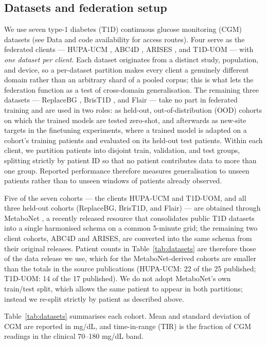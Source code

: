 \documentclass[10pt,letterpaper]{article}
\begin{document}
\subsection*{Datasets and federation setup}

We use seven type-1 diabetes (T1D) continuous glucose
monitoring (CGM) datasets (see Data and code availability for access routes). Four serve as the federated clients --- HUPA-UCM
\cite{hidalgo2024hupaucm}, ABC4D \cite{abc4d_nct}, ARISES \cite{zhu2022arises},
and T1D-UOM \cite{alsuhaymi2025t1duom} --- with \emph{one dataset per client}. Each dataset
originates from a distinct study, population, and device, so a per-dataset
partition makes every client a genuinely different domain rather than an
arbitrary shard of a pooled corpus; this is what lets the federation function as
a test of cross-domain generalisation. The remaining three datasets ---
ReplaceBG \cite{aleppo2017replacebg}, BrisT1D \cite{james2025brist1d}, and Flair
\cite{jaeb_flair} --- take no part in federated training and are used in two
roles: as held-out, out-of-distribution (OOD) cohorts on which the trained
models are tested zero-shot, and afterwards as new-site targets in the
finetuning experiments, where a trained model is adapted on a cohort's
training patients and evaluated on its held-out test patients. Within
each client, we partition patients
into disjoint train, validation, and test groups, splitting strictly by
patient ID so that no patient contributes data to more than one group. Reported performance therefore measures generalisation to
unseen patients rather than to unseen windows of patients already observed.

Five of the seven cohorts --- the clients HUPA-UCM and T1D-UOM, and all three
held-out cohorts (ReplaceBG, BrisT1D, and Flair) --- are obtained through
MetaboNet \cite{wolff2026metabonet}, a
recently released resource that consolidates public T1D datasets into a single
harmonised schema on a common 5-minute grid; the remaining two client cohorts,
ABC4D and ARISES, are converted
into the same schema from their original releases. Patient counts in
Table~\ref{tab:datasets} are therefore those of the data release we use, which
for the MetaboNet-derived cohorts are smaller than the totals in the source
publications (HUPA-UCM: 22 of the 25 published; T1D-UOM: 14 of the 17
published). We do not adopt MetaboNet's own train/test split, which allows the
same patient to appear in both partitions; instead we re-split strictly by
patient as described above.

Table~\ref{tab:datasets} summarises each cohort. Mean and standard deviation of
CGM are reported in mg/dL, and time-in-range (TIR) is the fraction of CGM
readings in the clinical 70--180 mg/dL band.
\end{document}
